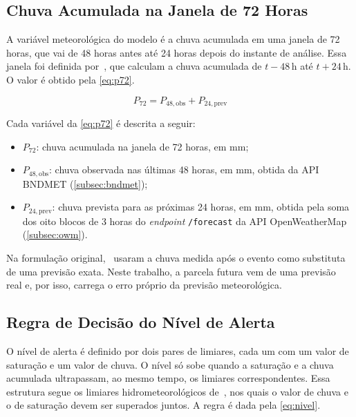 \subsection{Chuva Acumulada na Janela de 72 Horas}
\label{subsec:chuva72h}

A variável meteorológica do modelo é a chuva acumulada em uma janela
de 72 horas, que vai de 48 horas antes até 24 horas depois do instante
de análise. Essa janela foi definida por~, que calculam a chuva acumulada
de $t-48$\,h até $t+24$\,h. O valor é obtido pela \autoref{eq:p72}.

\begin{equation}
\label{eq:p72}
P_{72} = P_{48,\mathrm{obs}} + P_{24,\mathrm{prev}}
\end{equation}

Cada variável da \autoref{eq:p72} é descrita a seguir:

\begin{itemize}
  \item $P_{72}$: chuva acumulada na janela de 72 horas, em mm;
  \item $P_{48,\mathrm{obs}}$: chuva observada nas últimas 48 horas,
        em mm, obtida da API BNDMET (\autoref{subsec:bndmet});
  \item $P_{24,\mathrm{prev}}$: chuva prevista para as próximas 24
        horas, em mm, obtida pela soma dos oito blocos de 3 horas do
        \textit{endpoint} \texttt{/forecast} da API OpenWeatherMap
        (\autoref{subsec:owm}).
\end{itemize}

Na formulação original,~ usaram
a chuva medida após o evento como substituta de uma previsão exata.
Neste trabalho, a parcela futura vem de uma previsão real e, por isso,
carrega o erro próprio da previsão meteorológica.

\subsection{Regra de Decisão do Nível de Alerta}
\label{subsec:regra-decisao}

O nível de alerta é definido por dois pares de limiares, cada um com
um valor de saturação e um valor de chuva. O nível só sobe quando a
saturação e a chuva acumulada ultrapassam, ao mesmo tempo, os limiares
correspondentes. Essa estrutura segue os limiares hidrometeorológicos
de~, nos quais o valor de chuva e o de
saturação devem ser superados juntos. A regra é dada pela
\autoref{eq:nivel}.

